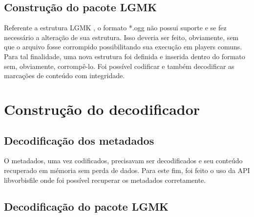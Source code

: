 \subsection{Construção do pacote LGMK}

Referente a estrutura LGMK \cite{herbert}, o formato *.ogg não possui suporte e se fez necessário a alteração de sua estrutura. Isso deveria ser feito, obviamente, sem que o arquivo fosse corrompido possibilitando sua execução em players comuns. Para tal finalidade, uma nova estrutura foi definida e inserida dentro do formato sem, obviamente, corrompê-lo. Foi possível codificar e também decodificar as marcações de conteúdo com integridade.

\section{Construção do decodificador}



\subsection{Decodificação dos metadados}

O metadados, uma vez codificados, precisavam ser decodificados e seu conteúdo recuperado em mémoria sem perda de dados. Para este fim, foi feito o uso da API libvorbisfile onde foi possível recuperar os metadados corretamente.


\subsection{Decodificação do pacote LGMK}

